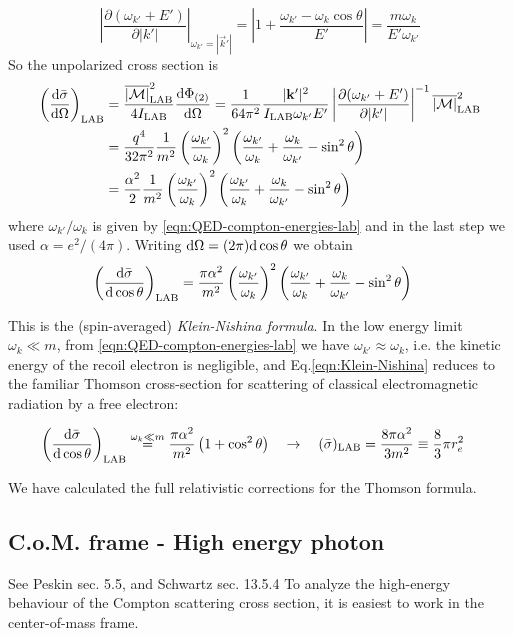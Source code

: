 \documentclass[TheoreticalPhy_ModB.tex]{subfiles}
\begin{document}
\[\left|\frac{\partial(\omega_{k'}+E')}{\partial|k'|}\right|_{\omega_{k'}=|\vec k'|}
=\left|1+\frac{\omega_{k'}-\omega_k\cos\theta}{E'}\right|
=\frac{m\omega_k}{E'\omega_{k'}}
\]
So the unpolarized cross section is 
\begin{align*}
\left(\frac{\textup{d}\bar\sigma}{\textup{d}\Omega}\right)_{\textup{LAB}}&=
\frac{\overline{|\mathcal M|}_{\textup{LAB}}^2}{4I_{\textup{LAB}}}\frac{\textup{d}\Phi_{(2)}}{\textup{d}\Omega}
=\frac1{64\pi^2}\frac{|\mathbf k'|^2}{I_{\textup{LAB}}\omega_{k'}E'}\left|\frac{\partial(\omega_{k'}+E')}{\partial|k'|}\right|^{-1}\overline{|\mathcal M|}_{\textup{LAB}}^2\\
&=\frac{q^4}{32\pi^2}\frac1{m^2}\left(\frac{\omega_{k'}}{\omega_k}\right)^2\left(\frac{\omega_{k'}}{\omega_k}+\frac{\omega_k}{\omega_{k'}}-\sin^2\theta\right)\\
&=\frac{\alpha^2}{2}\frac1{m^2}\left(\frac{\omega_{k'}}{\omega_k}\right)^2\left(\frac{\omega_{k'}}{\omega_k}+\frac{\omega_k}{\omega_{k'}}-\sin^2\theta\right)
\end{align*}
where $\omega_{k'}/\omega_{k}$ is given by \eqref{eqn:QED-compton-energies-lab} and in the last step we used $\alpha=e^2/(4\pi)$. Writing $\textup{d}\Omega=(2\pi)\textup{d}\cos\theta$ we obtain
\begin{align}\label{eqn:Klein-Nishina}
\left(\frac{\textup{d}\bar\sigma}{\textup{d}\cos\theta}\right)_{\textup{LAB}}&=
\frac{\pi\alpha^2}{m^2}\left(\frac{\omega_{k'}}{\omega_k}\right)^2\left(\frac{\omega_{k'}}{\omega_k}+\frac{\omega_k}{\omega_{k'}}-\sin^2\theta\right)
\end{align}

This is the (spin-averaged) \emph{Klein-Nishina formula}.
In the low energy limit $\omega_k\ll m$, from \eqref{eqn:QED-compton-energies-lab} we have $\omega_{k'}\approx\omega_{k}$, i.e. the kinetic energy of the recoil electron is negligible, and Eq.\eqref{eqn:Klein-Nishina} reduces to the familiar Thomson cross-section for scattering of classical electromagnetic radiation by a free electron:

\begin{align*}
\left(\frac{\textup{d}\bar\sigma}{\textup{d}\cos\theta}\right)_{\textup{LAB}}&\overset{\omega_k\ll m}{=}
\frac{\pi\alpha^2}{m^2}\left(1+\cos^2\theta\right)
\quad\rightarrow\quad
(\bar\sigma)_{\textup{LAB}}=\frac{8\pi\alpha^2}{3m^2}\equiv\frac83\pi r_e^2
\end{align*}

We have calculated the full relativistic corrections for the Thomson formula.

\subsection{C.o.M. frame - High energy photon}
\textsf{See Peskin sec. 5.5, and Schwartz sec. 13.5.4}
To analyze the high-energy behaviour of the Compton scattering cross section, it is easiest to work in the center-of-mass frame.
\end{document}

